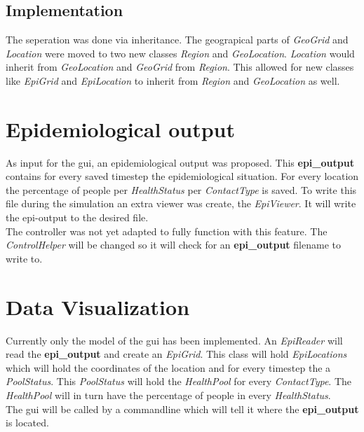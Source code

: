 \subsection{Implementation}
The seperation was done via inheritance. The geograpical parts of \textit{GeoGrid} and \textit{Location} were moved to two new classes \textit{Region} and \textit{GeoLocation}. \textit{Location} would inherit from \textit{GeoLocation} and \textit{GeoGrid} from \textit{Region}. This allowed for new classes like \textit{EpiGrid} and \textit{EpiLocation} to inherit from \textit{Region} and \textit{GeoLocation} as well.\\

\section{Epidemiological output}
As input for the gui, an epidemiological output was proposed. This \textbf{epi\_output} contains for every saved timestep the epidemiological situation. For every location the percentage of people per \textit{HealthStatus} per \textit{ContactType} is saved. To write this file during the simulation an extra viewer was create, the \textit{EpiViewer}. It will write the epi-output to the desired file.\\
The controller was not yet adapted to fully function with this feature. The \textit{ControlHelper} will be changed so it will check for an \textbf{epi\_output} filename to write to.\\

\section{Data Visualization}
Currently only the model of the gui has been implemented. An \textit{EpiReader} will read the \textbf{epi\_output} and create an \textit{EpiGrid}. This class will hold \textit{EpiLocations} which will hold the coordinates of the location and for every timestep the a \textit{PoolStatus}. This \textit{PoolStatus} will hold the \textit{HealthPool} for every \textit{ContactType}. The \textit{HealthPool} will in turn have the percentage of people in every \textit{HealthStatus}.\\
The gui will be called by a commandline which will tell it where the \textbf{epi\_output} is located.


 